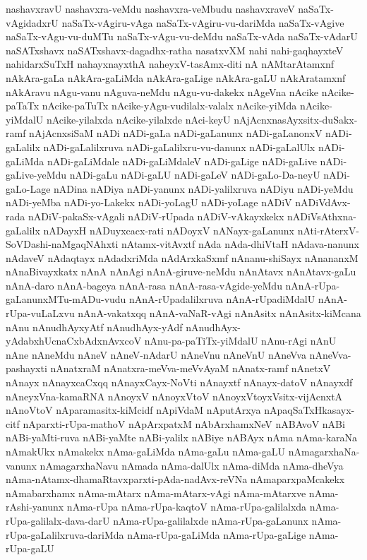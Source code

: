 {nashavxravU
nashavxra-veMdu
nashavxra-veMbudu
nashavxraveV
naSaTx-vAgidadxrU
naSaTx-vAgiru-vAga
naSaTx-vAgiru-vu-dariMda
naSaTx-vAgive
naSaTx-vAgu-vu-duMTu
naSaTx-vAgu-vu-deMdu
naSaTx-vAda
naSaTx-vAdarU
naSATxshavx
naSATxshavx-dagadhx-ratha
nasatxvXM
nahi
nahi-gaqhayxteV
nahidarxSuTxH
nahayxnayxthA
naheyxV-tasAmx-diti
nA
nAMtarAtamxnf
nAkAra-gaLa
nAkAra-gaLiMda
nAkAra-gaLige
nAkAra-gaLU
nAkAratamxnf
nAkAravu
nAgu-vanu
nAguva-neMdu
nAgu-vu-dakekx
nAgeVna
nAcike
nAcike-paTaTx
nAcike-paTuTx
nAcike-yAgu-vudilalx-valalx
nAcike-yiMda
nAcike-yiMdalU
nAcike-yilalxda
nAcike-yilalxde
nAci-keyU
nAjAcnxnasAyxsitx-duSakx-ramf
nAjAcnxsiSaM
nADi
nADi-gaLa
nADi-gaLanunx
nADi-gaLanonxV
nADi-gaLalilx
nADi-gaLalilxruva
nADi-gaLalilxru-vu-danunx
nADi-gaLalUlx
nADi-gaLiMda
nADi-gaLiMdale
nADi-gaLiMdaleV
nADi-gaLige
nADi-gaLive
nADi-gaLive-yeMdu
nADi-gaLu
nADi-gaLU
nADi-gaLeV
nADi-gaLo-Da-neyU
nADi-gaLo-Lage
nADina
nADiya
nADi-yanunx
nADi-yalilxruva
nADiyu
nADi-yeMdu
nADi-yeMba
nADi-yo-Lakekx
nADi-yoLagU
nADi-yoLage
nADiV
nADiVdAvx-rada
nADiV-pakaSx-vAgali
nADiV-rUpada
nADiV-vAkayxkekx
nADiVsAthxna-gaLalilx
nADayxH
nADuyxcacx-rati
nADoyxV
nANayx-gaLanunx
nAti-rAterxV-SoVDashi-naMgaqNAhxti
nAtamx-vitAvxtf
nAda
nAda-dhiVtaH
nAdava-nanunx
nAdaveV
nAdaqtayx
nAdadxriMda
nAdArxkaSxmf
nAnanu-shiSayx
nAnananxM
nAnaBivayxkatx
nAnA
nAnAgi
nAnA-giruve-neMdu
nAnAtavx
nAnAtavx-gaLu
nAnA-daro
nAnA-bageya
nAnA-rasa
nAnA-rasa-vAgide-yeMdu
nAnA-rUpa-gaLanunxMTu-mADu-vudu
nAnA-rUpadalilxruva
nAnA-rUpadiMdalU
nAnA-rUpa-vuLaLxvu
nAnA-vakatxqq
nAnA-vaNaR-vAgi
nAnAsitx
nAnAsitx-kiMcana
nAnu
nAnudhAyxyAtf
nAnudhAyx-yAdf
nAnudhAyx-yAdabxhUcnaCxbAdxnAvxcoV
nAnu-pa-paTiTx-yiMdalU
nAnu-rAgi
nAnU
nAne
nAneMdu
nAneV
nAneV-nAdarU
nAneVnu
nAneVnU
nAneVva
nAneVva-pashayxti
nAnatxraM
nAnatxra-meVva-meVvAyaM
nAnatx-ramf
nAnetxV
nAnayx
nAnayxcaCxqq
nAnayxCayx-NoVti
nAnayxtf
nAnayx-datoV
nAnayxdf
nAneyxVna-kamaRNA
nAnoyxV
nAnoyxVtoV
nAnoyxVtoyxVsitx-vijAcnxtA
nAnoVtoV
nAparamasitx-kiMcidf
nApiVdaM
nAputArxya
nApaqSaTxHkasayx-citf
nAparxti-rUpa-mathoV
nApArxpatxM
nAbArxhamxNeV
nABAvoV
nABi
nABi-yaMti-ruva
nABi-yaMte
nABi-yalilx
nABiye
nABAyx
nAma
nAma-karaNa
nAmakUkx
nAmakekx
nAma-gaLiMda
nAma-gaLu
nAma-gaLU
nAmagarxhaNa-vanunx
nAmagarxhaNavu
nAmada
nAma-dalUlx
nAma-diMda
nAma-dheVya
nAma-nAtamx-dhamaRtavxparxti-pAda-nadAvx-reVNa
nAmaparxpaMcakekx
nAmabarxhamx
nAma-mAtarx
nAma-mAtarx-vAgi
nAma-mAtarxve
nAma-rAshi-yanunx
nAma-rUpa
nAma-rUpa-kaqtoV
nAma-rUpa-galilalxda
nAma-rUpa-galilalx-dava-darU
nAma-rUpa-galilalxde
nAma-rUpa-gaLanunx
nAma-rUpa-gaLalilxruva-dariMda
nAma-rUpa-gaLiMda
nAma-rUpa-gaLige
nAma-rUpa-gaLU
}
